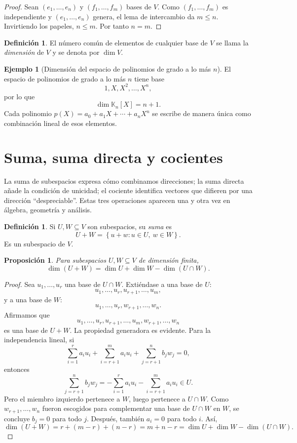 \documentclass[10pt,a4paper,oneside]{article}
\theoremstyle{plain}
\newtheorem{proposition}[theorem]{Proposición}
\theoremstyle{definition}
\newtheorem{definition}[theorem]{Definición}
\newtheorem{example}[theorem]{Ejemplo}
\theoremstyle{remark}
\newcommand{\K}{\mathbb{K}}
\newcommand{\set}[1]{\left\{ #1 \right\}}
\begin{document}
\begin{proof}
Sean \((e_1,\dots,e_n)\) y \((f_1,\dots,f_m)\) bases de \(V\). Como \((f_1,\dots,f_m)\) es independiente y \((e_1,\dots,e_n)\) genera, el lema de intercambio da \(m\le n\). Invirtiendo los papeles, \(n\le m\). Por tanto \(n=m\). \end{proof}

\begin{definition}
El número común de elementos de cualquier base de \(V\) se llama la \emph{dimensión} de \(V\) y se denota por \(\dim V\).
\end{definition}

\begin{example}[Dimensión del espacio de polinomios de grado a lo más $n$]
El espacio de polinomios de grado a lo más \(n\) tiene base
\[
1,X,X^2,\dots,X^n,
\]
por lo que
\[
\dim \K_n[X]=n+1.
\]
Cada polinomio \(p(X)=a_0+a_1X+\cdots+a_nX^n\) se escribe de manera única como combinación lineal de esos elementos.
\end{example}

\section{Suma, suma directa y cocientes}
\begin{ideaBox}
La suma de subespacios expresa cómo combinamos direcciones; la suma directa añade la condición de unicidad; el cociente identifica vectores que difieren por una dirección ``despreciable''. Estas tres operaciones aparecen una y otra vez en álgebra, geometría y análisis.
\end{ideaBox}
\begin{definition}
Si \(U,W\subseteq V\) son subespacios, su \emph{suma} es
\[
U+W=\set{u+w: u\in U,\ w\in W}.
\]
Es un subespacio de \(V\).
\end{definition}

\begin{proposition}
Para subespacios \(U,W\subseteq V\) de dimensión finita,
\[
\dim(U+W)=\dim U+\dim W-\dim(U\cap W).
\]
\end{proposition}

\begin{proof}
Sea \(u_1,\dots,u_r\) una base de \(U\cap W\). Extiéndase a una base de \(U\):
\[
u_1,\dots,u_r,u_{r+1},\dots,u_m,
\]
y a una base de \(W\):
\[
u_1,\dots,u_r,w_{r+1},\dots,w_n.
\]
Afirmamos que
\[
u_1,\dots,u_r,u_{r+1},\dots,u_m,w_{r+1},\dots,w_n
\]
es una base de \(U+W\). La propiedad generadora es evidente. Para la independencia lineal, si
\[
\sum_{i=1}^r a_i u_i+\sum_{i=r+1}^m a_i u_i+\sum_{j=r+1}^n b_j w_j=0,
\]
entonces
\[
\sum_{j=r+1}^n b_j w_j=-\sum_{i=1}^r a_i u_i-\sum_{i=r+1}^m a_i u_i\in U.
\]
Pero el miembro izquierdo pertenece a \(W\), luego pertenece a \(U\cap W\). Como \(w_{r+1},\dots,w_n\) fueron escogidos para complementar una base de \(U\cap W\) en \(W\), se concluye \(b_j=0\) para todo \(j\). Después, también \(a_i=0\) para todo \(i\). Así,
\[
\dim(U+W)=r+(m-r)+(n-r)=m+n-r=\dim U+\dim W-\dim(U\cap W).
\]
\end{proof}
\end{document}
